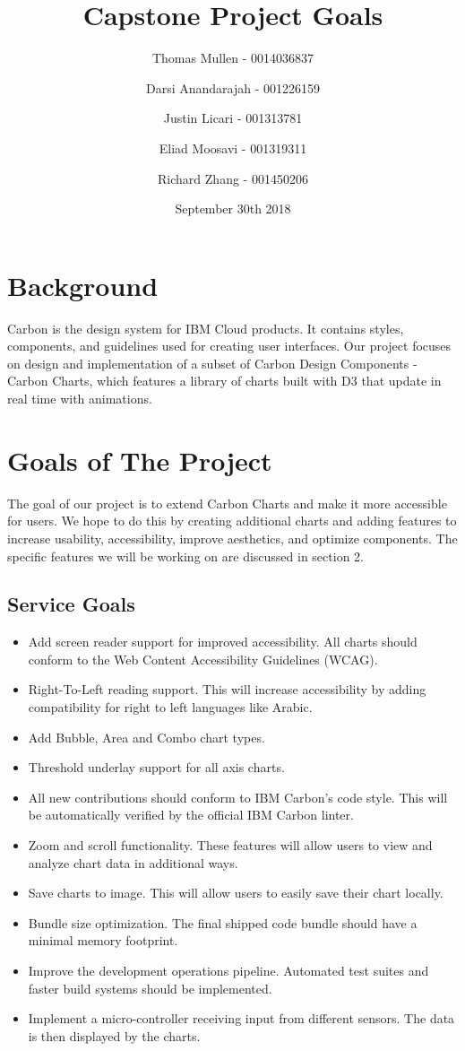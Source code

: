 \documentclass[11pt,english]{article}
\title{Capstone Project Goals}
\author{
  Thomas Mullen - 0014036837 \\
\and
 Darsi Anandarajah - 001226159 \\
\and
 Justin Licari - 001313781 \\
\and
 Eliad Moosavi - 001319311 \\
\and
 Richard Zhang - 001450206
}
\date{September 30th 2018}
\begin{document}
\maketitle
\section{Background}
Carbon is the design system for IBM Cloud products. It contains styles, components, and guidelines used for creating user interfaces. Our project focuses on design and implementation of a subset of Carbon Design Components - Carbon Charts, which features a library of charts built with D3 that update in real time with animations. 

\section{Goals of The Project}

The goal of our project is to extend Carbon Charts and make it more accessible for users. We hope to do this by creating additional charts and adding features to increase usability, accessibility, improve aesthetics,  and optimize components. The specific features we will be working on are discussed in section 2.

\subsection{Service Goals}
\begin{itemize}
\item Add screen reader support for improved accessibility. All charts should conform to the Web Content Accessibility Guidelines (WCAG).
\item Right-To-Left reading support. This will increase accessibility by adding compatibility for right to left languages like Arabic.
\item Add Bubble, Area and Combo chart types. 
\item Threshold underlay support for all axis charts.
\item All new contributions should conform to IBM Carbon's code style. This will be automatically verified by the official IBM Carbon linter.
\item Zoom and scroll functionality. These features will allow users to view and analyze chart data in additional ways.
\item Save charts to image. This will allow users to easily save their chart locally.
\item Bundle size optimization. The final shipped code bundle should have a minimal memory footprint.
\item Improve the development operations pipeline. Automated test suites and faster build systems should be implemented.
\item Implement a micro-controller receiving input from different sensors. The data is then displayed by the charts. 
\end{itemize}
\end{document}
